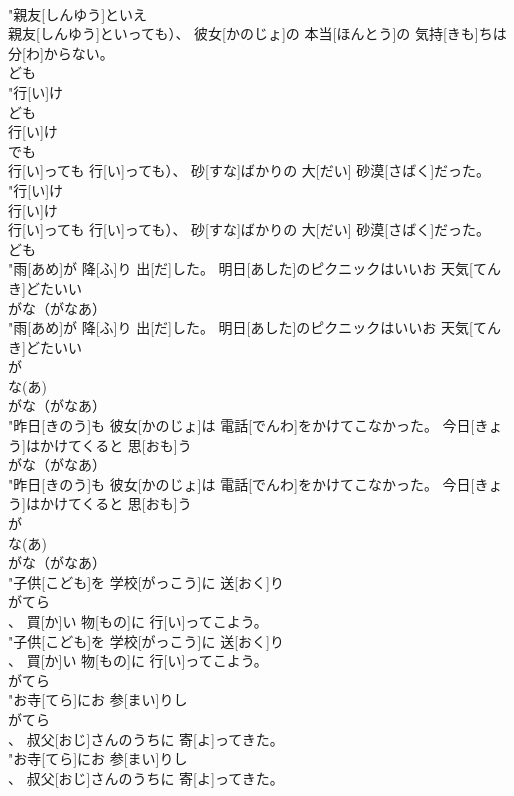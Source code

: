 \documentclass[8pt]{extreport}
\begin{document}
\begin{CJK}{UTF8}{min}
\\	"親友[しんゆう]といえ
\\	親友[しんゆう]といっても）、 彼女[かのじょ]の 本当[ほんとう]の 気持[きも]ちは 分[わ]からない。
\\	ども
\\	"行[い]け
\\	ども
\\	行[い]け
\\	でも
\\	行[い]っても 行[い]っても）、 砂[すな]ばかりの 大[だい] 砂漠[さばく]だった。
\\	"行[い]け
\\	行[い]け
\\	行[い]っても 行[い]っても）、 砂[すな]ばかりの 大[だい] 砂漠[さばく]だった。
\\	ども
\\	"雨[あめ]が 降[ふ]り 出[だ]した。 明日[あした]のピクニックはいいお 天気[てんき]どたいい
\\	がな（がなあ）
\\	"雨[あめ]が 降[ふ]り 出[だ]した。 明日[あした]のピクニックはいいお 天気[てんき]どたいい
\\	が 
\\	な(あ)	
\\	がな（がなあ）
\\	"昨日[きのう]も 彼女[かのじょ]は 電話[でんわ]をかけてこなかった。 今日[きょう]はかけてくると 思[おも]う
\\	がな（がなあ）
\\	"昨日[きのう]も 彼女[かのじょ]は 電話[でんわ]をかけてこなかった。 今日[きょう]はかけてくると 思[おも]う
\\	が 
\\	な(あ)	
\\	がな（がなあ）
\\	"子供[こども]を 学校[がっこう]に 送[おく]り
\\	がてら
\\	、 買[か]い 物[もの]に 行[い]ってこよう。
\\	"子供[こども]を 学校[がっこう]に 送[おく]り
\\	、 買[か]い 物[もの]に 行[い]ってこよう。
\\	がてら
\\	"お寺[てら]にお 参[まい]りし
\\	がてら
\\	、 叔父[おじ]さんのうちに 寄[よ]ってきた。
\\	"お寺[てら]にお 参[まい]りし
\\	、 叔父[おじ]さんのうちに 寄[よ]ってきた。

\end{CJK}
\end{document}
